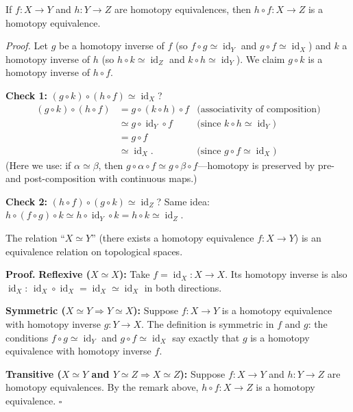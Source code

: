 \documentclass[11pt]{report}
\renewenvironment{proof}[1][Proof]{\noindent\textbf{#1.} }{\hfill$\square$\par\vspace{5pt}}
\begin{document}
\begin{rembox}
If $f: X \to Y$ and $h: Y \to Z$ are homotopy equivalences, then $h \circ f: X \to Z$ is a homotopy equivalence.

\textit{Proof.} Let $g$ be a homotopy inverse of $f$ (so $f \circ g \simeq \operatorname{id}_Y$ and $g \circ f \simeq \operatorname{id}_X$) and $k$ a homotopy inverse of $h$ (so $h \circ k \simeq \operatorname{id}_Z$ and $k \circ h \simeq \operatorname{id}_Y$). We claim $g \circ k$ is a homotopy inverse of $h \circ f$.

\textbf{Check 1:} $(g \circ k) \circ (h \circ f) \simeq \operatorname{id}_X$?
\begin{align*}
(g \circ k) \circ (h \circ f) &= g \circ (k \circ h) \circ f &\text{(associativity of composition)}\\
&\simeq g \circ \operatorname{id}_Y \circ f &\text{(since } k \circ h \simeq \operatorname{id}_Y\text{)}\\
&= g \circ f &\\
&\simeq \operatorname{id}_X. &\text{(since } g \circ f \simeq \operatorname{id}_X\text{)}
\end{align*}
(Here we use: if $\alpha \simeq \beta$, then $g \circ \alpha \circ f \simeq g \circ \beta \circ f$---homotopy is preserved by pre- and post-composition with continuous maps.)

\textbf{Check 2:} $(h \circ f) \circ (g \circ k) \simeq \operatorname{id}_Z$? Same idea: $h \circ (f \circ g) \circ k \simeq h \circ \operatorname{id}_Y \circ k = h \circ k \simeq \operatorname{id}_Z$.
\end{rembox}

\begin{thmbox}
The relation ``$X \simeq Y$'' (there exists a homotopy equivalence $f: X \to Y$) is an equivalence relation on topological spaces.
\end{thmbox}

\begin{proof}
\textbf{Reflexive ($X \simeq X$):} Take $f = \operatorname{id}_X: X \to X$. Its homotopy inverse is also $\operatorname{id}_X$: $\operatorname{id}_X \circ \operatorname{id}_X = \operatorname{id}_X \simeq \operatorname{id}_X$ in both directions.

\textbf{Symmetric ($X \simeq Y \Rightarrow Y \simeq X$):} Suppose $f: X \to Y$ is a homotopy equivalence with homotopy inverse $g: Y \to X$. The definition is symmetric in $f$ and $g$: the conditions $f \circ g \simeq \operatorname{id}_Y$ and $g \circ f \simeq \operatorname{id}_X$ say exactly that $g$ is a homotopy equivalence with homotopy inverse $f$.

\textbf{Transitive ($X \simeq Y$ and $Y \simeq Z \Rightarrow X \simeq Z$):} Suppose $f: X \to Y$ and $h: Y \to Z$ are homotopy equivalences. By the remark above, $h \circ f: X \to Z$ is a homotopy equivalence.
\end{proof}
\end{document}
